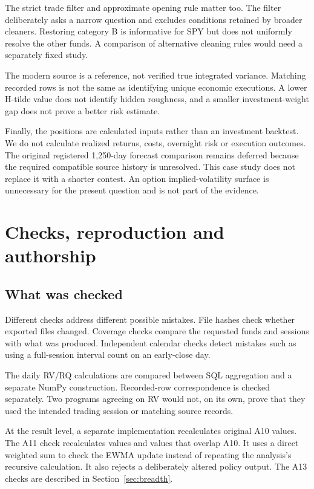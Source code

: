 The strict trade filter and approximate opening rule matter too. The filter deliberately asks a narrow question and excludes conditions retained by broader cleaners. Restoring category B is informative for SPY but does not uniformly resolve the other funds. A comparison of alternative cleaning rules would need a separately fixed study.

The modern source is a reference, not verified true integrated variance. Matching recorded rows is not the same as identifying unique economic executions. A lower H-tilde value does not identify hidden roughness, and a smaller investment-weight gap does not prove a better risk estimate.

Finally, the positions are calculated inputs rather than an investment backtest. We do not calculate realized returns, costs, overnight risk or execution outcomes. The original registered 1,250-day forecast comparison remains deferred because the required compatible source history is unresolved. This case study does not replace it with a shorter contest. An option implied-volatility surface is unnecessary for the present question and is not part of the evidence.

\section{Checks, reproduction and authorship}\label{sec:reproduction}
\subsection{What was checked}
Different checks address different possible mistakes. File hashes check whether exported files changed. Coverage checks compare the requested funds and sessions with what was produced. Independent calendar checks detect mistakes such as using a full-session interval count on an early-close day.

The daily RV/RQ calculations are compared between SQL aggregation and a separate NumPy construction. Recorded-row correspondence is checked separately. Two programs agreeing on RV would not, on its own, prove that they used the intended trading session or matching source records.

At the result level, a separate implementation recalculates  original A10 values. The A11 check recalculates  values and  values that overlap A10. It uses a direct weighted sum to check the EWMA update instead of repeating the analysis's recursive calculation. It also rejects a deliberately altered policy output. The A13 checks are described in Section~\ref{sec:breadth}.

